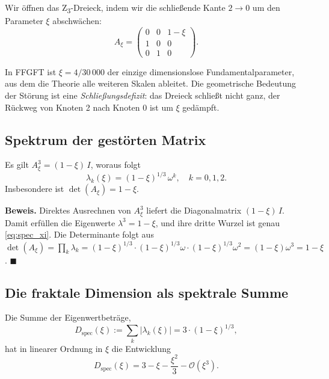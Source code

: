 Wir öffnen das Z\textsubscript{3}-Dreieck, indem wir die schließende Kante \(2 \to 0\) um den Parameter \(\xi\) abschwächen:
\begin{equation}
A_\xi = \begin{pmatrix} 0 & 0 & 1 - \xi \\ 1 & 0 & 0 \\ 0 & 1 & 0 \end{pmatrix}.
\label{eq:Axi}
\end{equation}

In FFGFT ist \(\xi = 4/30\,000\) der einzige dimensionslose Fundamentalparameter, aus dem die Theorie alle weiteren Skalen ableitet. Die geometrische Bedeutung der Störung ist eine \emph{Schließungsdefizit}: das Dreieck schließt nicht ganz, der Rückweg von Knoten 2 nach Knoten 0 ist um \(\xi\) gedämpft.

\subsection{Spektrum der gestörten Matrix}

\begin{foundation}
Es gilt \(A_\xi^3 = (1 - \xi)\,I\), woraus folgt
\begin{equation}
\lambda_k(\xi) = (1 - \xi)^{1/3}\,\omega^k, \quad k = 0, 1, 2.
\label{eq:spec_xi}
\end{equation}
Insbesondere ist \(\det(A_\xi) = 1 - \xi\).
\end{foundation}

\noindent\textbf{Beweis.} Direktes Ausrechnen von \(A_\xi^3\) liefert die Diagonalmatrix \((1-\xi)\,I\). Damit erfüllen die Eigenwerte \(\lambda^3 = 1 - \xi\), und ihre dritte Wurzel ist genau \eqref{eq:spec_xi}. Die Determinante folgt aus \(\det(A_\xi) = \prod_k \lambda_k = (1-\xi)^{1/3} \cdot (1-\xi)^{1/3} \omega \cdot (1-\xi)^{1/3} \omega^2 = (1-\xi) \omega^3 = 1 - \xi\). \(\blacksquare\)

\subsection{Die fraktale Dimension als spektrale Summe}

Die Summe der Eigenwertbeträge,
\begin{equation}
D_\text{spec}(\xi) := \sum_k |\lambda_k(\xi)| = 3 \cdot (1 - \xi)^{1/3},
\label{eq:Dspec}
\end{equation}
hat in linearer Ordnung in \(\xi\) die Entwicklung
\begin{equation}
D_\text{spec}(\xi) = 3 - \xi - \frac{\xi^2}{3} - \mathcal{O}(\xi^3).
\label{eq:Dspec_taylor}
\end{equation}

